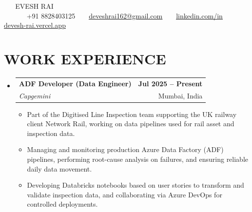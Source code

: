 \documentclass[letterpaper,11pt]{article}
\makeatletter
\newcommand{\resumeItem}[1]{
  \item\small{
    {#1 \vspace{-1pt}}
  }
}
\newcommand{\resumeSubheading}[4]{
  \vspace{-2pt}\item
    \begin{tabular*}{1.0\textwidth}[t]{l@{\extracolsep{\fill}}r}
      \textbf{\large#1} & \textbf{\small #2} \\
      \textit{\large#3} & \small #4 \\
      
    \end{tabular*}\vspace{-7pt}
}
\newcommand{\resumeSubHeadingListStart}{\begin{itemize}[leftmargin=0.0in, label={}]}
\newcommand{\resumeSubHeadingListEnd}{\end{itemize}}
\newcommand{\resumeItemListStart}{\begin{itemize}[leftmargin=0.1in]}
\newcommand{\resumeItemListEnd}{\end{itemize}\vspace{-5pt}}
\makeatother
\begin{document}
\begin{center}
    {\huge {}EVESH {\Huge R}AI} \\ \vspace{2pt}
    \small
    {\color{blue}\faPhone} \hspace{0.2em} +91 8828403125 
    {\color{blue}\faEnvelope} \hspace{0.2em} \underline{\href{mailto:deveshrai162@gmail.com}{deveshrai162@gmail.com}} 
    {\color{blue}\faLinkedin} \hspace{0.2em} \underline{\href{https://www.linkedin.com/in/devesshhh}{linkedin.com/in}} 
    {\color{blue}\faLink} \hspace{0.2em} \underline{\href{https://devesh-rai.vercel.app}{devesh-rai.vercel.app}}
    \vspace{-3pt}
\end{center}


\section{\color{airforceblue}WORK EXPERIENCE}
\resumeSubHeadingListStart

    \resumeSubheading
    {ADF Developer (Data Engineer)}{Jul 2025 -- Present}
    {Capgemini}{Mumbai, India}
    \resumeItemListStart
        \resumeItem{\normalsize{Part of the Digitised Line Inspection team supporting the UK railway client Network Rail, working on data pipelines used for rail asset and inspection data.}}
        \resumeItem{\normalsize{Managing and monitoring production Azure Data Factory (ADF) pipelines, performing root-cause analysis on failures, and ensuring reliable daily data movement.}}
        \resumeItem{\normalsize{Developing Databricks notebooks based on user stories to transform and validate inspection data, and collaborating via Azure DevOps for controlled deployments.}}
    \resumeItemListEnd

\resumeSubHeadingListEnd
\vspace{-12pt}


\end{document}
